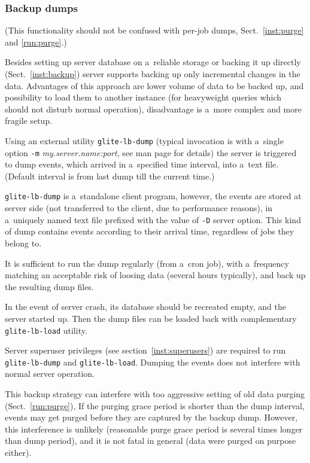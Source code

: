 \subsubsection{Backup dumps}

(This functionality should not be confused with per-job dumps, Sect.~\ref{inst:purge} and \ref{run:purge}.)

Besides setting up \LB server database on a~reliable storage or
backing it up directly (Sect.~\ref{inst:backup})
\LB server supports backing up only incremental changes in the data.
Advantages of this approach are lower volume of data to be backed up,
and possibility to load them to another instance (\eg for heavyweight
queries which should not disturb normal operation), disadvantage is
a~more complex and more fragile setup. 

Using an external utility \verb'glite-lb-dump' (typical invocation is with
a~single option \verb'-m' \emph{my.server.name:port}, see man page for
details) the server is triggered to dump events, which arrived in
a~specified time interval, into a~text file. (Default interval is from last
dump till the current time.)

\verb'glite-lb-dump' is a~standalone client program, however, 
the events are stored at server side (\ie not transferred to the client,
due to performance reasons),
in a~uniquely named text
file prefixed with the value of \verb'-D' server option. This kind of dump
contains events according to their arrival time, regardless of jobs they belong
to.

It is sufficient to run the dump regularly (from a~cron job), with a~frequency
matching an acceptable risk of loosing data (several hours typically), and back
up the resulting dump files. 

In the event of server crash, its database should be recreated empty,
and the server started up.
Then the dump files can be loaded back with complementary
\verb'glite-lb-load' utility.

Server superuser privileges (see section~\ref{inst:superusers}) are required to run \verb'glite-lb-dump' and \verb'glite-lb-load'.
Dumping the events does not interfere with normal server operation.

This backup strategy can interfere with too aggressive setting of old
data purging (Sect.~\ref{run:purge}), 
If the purging grace period is shorter than the dump interval,
events may get purged before they are captured by the backup dump.
However, this interference is unlikely (reasonable purge grace period
is several times longer than dump period),
and it is not fatal in general (data were purged on purpose either).

